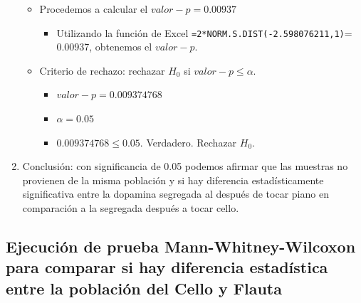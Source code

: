 \begin{enumerate}
\begin{itemize}
            \item Procedemos a calcular el $valor-p = 0.00937$
                \begin{itemize}
                    \item Utilizando la función de Excel \verb|=2*NORM.S.DIST(-2.598076211,1)|= 0.00937, obtenemos el $valor-p$.
                \end{itemize}
        \end{itemize}
        \begin{itemize}
            \item Criterio de rechazo: rechazar $H_0$ si $valor-p\leq \alpha$. 
                \begin{itemize}
                    \item $valor-p = 0.009374768$
                    \item $\alpha = 0.05$
                    \item $0.009374768 \leq 0.05$. Verdadero. Rechazar $H_0$.
                \end{itemize}
        \end{itemize}
    
    \item Conclusión: con significancia de 0.05 podemos afirmar que las muestras no provienen de la misma población y si hay diferencia estadísticamente significativa entre la dopamina segregada al después de tocar piano en comparación a la segregada después a tocar cello. 
\end{enumerate}



\subsection{Ejecución de prueba Mann-Whitney-Wilcoxon para comparar si hay diferencia estadística entre la población del Cello y Flauta}

